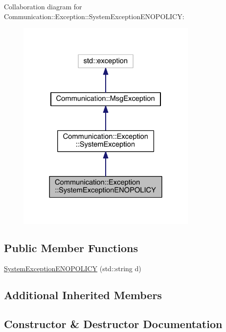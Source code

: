 Collaboration diagram for Communication\+:\+:Exception\+:\+:System\+Exception\+E\+N\+O\+P\+O\+L\+I\+C\+Y\+:\nopagebreak
\begin{figure}[H]
\begin{center}
\leavevmode
\includegraphics[width=252pt]{class_communication_1_1_exception_1_1_system_exception_e_n_o_p_o_l_i_c_y__coll__graph}
\end{center}
\end{figure}
\subsection*{Public Member Functions}
\begin{DoxyCompactItemize}
\item 
\hyperlink{class_communication_1_1_exception_1_1_system_exception_e_n_o_p_o_l_i_c_y_a489313149f198b83df72d0e595694f3e}{System\+Exception\+E\+N\+O\+P\+O\+L\+I\+C\+Y} (std\+::string d)
\end{DoxyCompactItemize}
\subsection*{Additional Inherited Members}


\subsection{Constructor \& Destructor Documentation}
\hypertarget{class_communication_1_1_exception_1_1_system_exception_e_n_o_p_o_l_i_c_y_a489313149f198b83df72d0e595694f3e}{}
